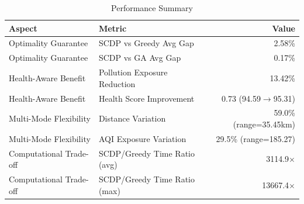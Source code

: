 \begin{table}[htbp]
\centering
\caption{Performance Summary}
\label{tab:summary}
\begin{tabular}{llr}
\hline
Aspect & Metric & Value \\
\hline
Optimality Guarantee & SCDP vs Greedy Avg Gap & 2.58\% \\
Optimality Guarantee & SCDP vs GA Avg Gap & 0.17\% \\
Health-Aware Benefit & Pollution Exposure Reduction & 13.42\% \\
Health-Aware Benefit & Health Score Improvement & 0.73 (94.59$\to$95.31) \\
Multi-Mode Flexibility & Distance Variation & 59.0\% (range=35.45km) \\
Multi-Mode Flexibility & AQI Exposure Variation & 29.5\% (range=185.27) \\
Computational Trade-off & SCDP/Greedy Time Ratio (avg) & 3114.9$\times$ \\
Computational Trade-off & SCDP/Greedy Time Ratio (max) & 13667.4$\times$ \\
\hline
\end{tabular}
\end{table}
